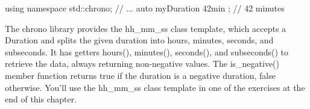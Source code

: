 \begin{cpp}
using namespace std::chrono;
// ...
auto myDuration { 42min }; // 42 minutes
\end{cpp}


The chrono library provides the hh\_mm\_ss class template, which accepts a Duration and splits the given duration into hours, minutes, seconds, and subseconds. It has getters hours(), minutes(), seconds(), and subseconds() to retrieve the data, always returning non-negative values. The is\_negative() member function returns true if the duration is a negative duration, false otherwise. You’ll use the hh\_mm\_ss class template in one of the exercises at the end of this chapter.
